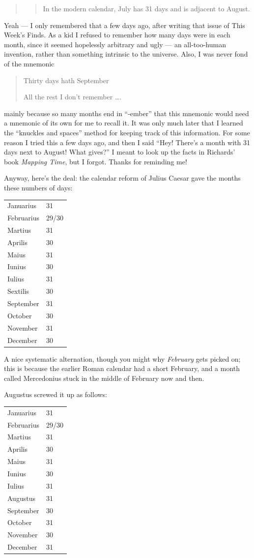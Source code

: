 \documentclass{article}
\begin{document}
\begin{quote}
\begin{quote}
In the modern calendar, July has 31 days and is adjacent to August.
\end{quote}
\end{quote}

Yeah --- I only remembered that a few days ago, after writing that issue
of This Week's Finds. As a kid I refused to remember how many days were
in each month, since it seemed hopelessly arbitrary and ugly --- an
all-too-human invention, rather than something intrinsic to the
universe. Also, I was never fond of the mnemonic

\begin{quote}
Thirty days hath September

All the rest I don't remember \ldots.
\end{quote}

mainly because so many months end in ``-ember'' that this mnemonic would
need a mnemonic of its own for me to recall it. It was only much later
that I learned the ``knuckles and spaces'' method for keeping track of
this information. For some reason I tried this a few days ago, and then
I said ``Hey! There's a month with 31 days next to August! What gives?''
I meant to look up the facts in Richards' book \emph{Mapping Time}, but
I forgot. Thanks for reminding me!

Anyway, here's the deal: the calendar reform of Julius Caesar gave the
months these numbers of days:

\begin{longtable}[]{@{}ll@{}}
\toprule
\endhead
Januarius & 31\tabularnewline
Februarius & 29/30\tabularnewline
Martius & 31\tabularnewline
Aprilis & 30\tabularnewline
Maius & 31\tabularnewline
Iunius & 30\tabularnewline
Iulius & 31\tabularnewline
Sextilis & 30\tabularnewline
September & 31\tabularnewline
October & 30\tabularnewline
November & 31\tabularnewline
December & 30\tabularnewline
\bottomrule
\end{longtable}

A nice systematic alternation, though you might why \emph{February} gets
picked on; this is because the earlier Roman calendar had a short
February, and a month called Mercedonius stuck in the middle of February
now and then.

Augustus screwed it up as follows:

\begin{longtable}[]{@{}ll@{}}
\toprule
\endhead
Januarius & 31\tabularnewline
Februarius & 29/30\tabularnewline
Martius & 31\tabularnewline
Aprilis & 30\tabularnewline
Maius & 31\tabularnewline
Iunius & 30\tabularnewline
Iulius & 31\tabularnewline
Augustus & 31\tabularnewline
September & 30\tabularnewline
October & 31\tabularnewline
November & 30\tabularnewline
December & 31\tabularnewline
\bottomrule
\end{longtable}
\end{document}

